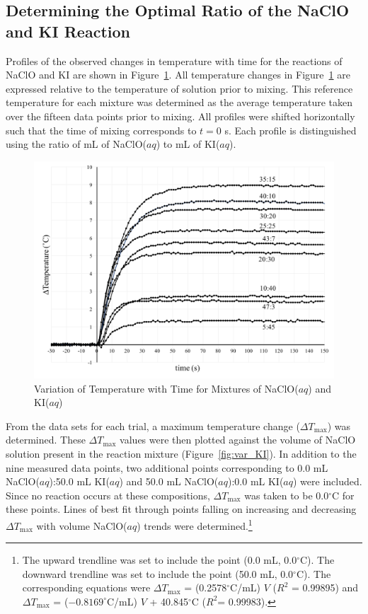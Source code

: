 \subsection{Determining the Optimal Ratio of the NaClO and KI Reaction}
Profiles of the observed changes in temperature with time for the reactions of NaClO and KI are shown in Figure~\ref{fig:temp_KI}.  
All temperature changes in Figure~\ref{fig:temp_KI} are expressed relative to the temperature of solution prior to mixing.  
This reference temperature for each mixture was determined as the average temperature taken over the fifteen data points prior to mixing.  
All profiles were shifted horizontally such that the time of mixing corresponds to $t = 0$ s.  Each profile is distinguished using the ratio of mL of 
NaClO($aq$) to mL of KI($aq$).

\begin{figure}[htbp]
\centering
\includegraphics[width=\textwidth]{Temperature_Profiles_KI_BW.png}
\caption{Variation of Temperature with Time for Mixtures of NaClO($aq$) and KI($aq$)}
\label{fig:temp_KI}
\end{figure}


From the data sets for each trial, a maximum temperature change ($\Delta T_\mathrm{max}$) was determined.  
These $\Delta T_\mathrm{max}$ values were then plotted against the volume of NaClO solution present in the reaction 
mixture (Figure~\ref{fig:var_KI}).  In addition to the nine measured data points, two additional points 
corresponding to 0.0 mL NaClO($aq$):50.0 mL KI($aq$) and 50.0 mL NaClO($aq$):0.0 mL KI($aq$) were included.  
Since no reaction occurs at these compositions, $\Delta T_\mathrm{max}$ was taken to be 0.0$^\circ$C for these points.  
Lines of best fit through points falling on increasing and decreasing $\Delta T_\mathrm{max}$ with volume NaClO($aq$) 
trends were determined.\footnote{The upward trendline was set to include the point (0.0 mL, 0.0$^\circ$C). The downward 
trendline was set to include the point (50.0 mL, 0.0$^\circ$C). The corresponding equations were 
$\Delta T_\mathrm{max}$ = (0.2578$^\circ$C/mL) $V$ ($R^2$ = 0.99895) and $\Delta T_\mathrm{max}$ = ($-0.8169^\circ$C/mL) $V$ + 40.845$^\circ$C ($R^2$= 0.99983).}  

